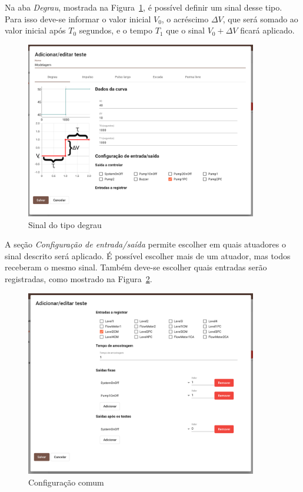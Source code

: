 Na aba \textit{Degrau}, mostrada na Figura~\ref{fig:system-response2}, é
possível definir um sinal desse tipo. Para isso deve-se informar o valor inicial
\textit{\(V_0\)}, o acréscimo \textit{\(\Delta{}V\)}, que será somado ao valor
inicial após \textit{\(T_0\)} segundos, e o tempo \textit{\(T_1\)} que o sinal
\textit{\(V_0 + \Delta{}V\)} ficará aplicado.

\begin{figure}[ht!]
    \centering
    \includegraphics[width=0.9\textwidth]{imgs/system-response2}
    \caption[Sinal do tipo degrau]{Sinal do tipo degrau}%
    \label{fig:system-response2}
\end{figure}

A seção \textit{Configuração de entrada/saída} permite escolher em quais
atuadores o sinal descrito será aplicado. É possível escolher mais de um
atuador, mas todos receberam o mesmo sinal. Também deve-se escolher quais
entradas serão registradas, como mostrado na Figura~\ref{fig:system-response3}.

\begin{figure}[ht!]
    \centering
    \includegraphics[width=0.9\textwidth]{imgs/system-response3}
    \caption[Configuração comum]{Configuração comum}%
    \label{fig:system-response3}
\end{figure}

